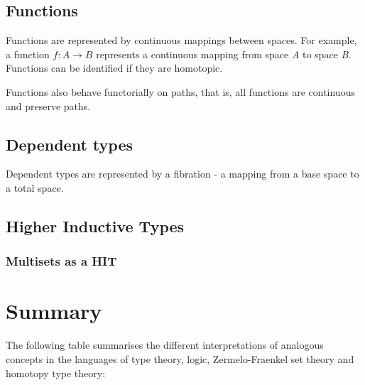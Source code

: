 \documentclass[12pt]{report}
\begin{document}
\subsection{Functions}
Functions are represented by continuous mappings between spaces. For example, a function $f : A \rightarrow B$ represents a continuous mapping from space \textit{A} to space \textit{B}. Functions can be identified if they are homotopic.

Functions also behave functorially on paths, that is, all functions are continuous and preserve paths.


\subsection{Dependent types}
Dependent types are represented by a fibration - a mapping from a base space to a total space.

\subsection{Higher Inductive Types}
\subsubsection{Multisets as a HIT}
\begin{center}

\end{center}




\section{Summary}

The following table summarises the different interpretations of analogous concepts in the languages of type theory, logic, Zermelo-Fraenkel set theory and homotopy type theory:
\end{document}
